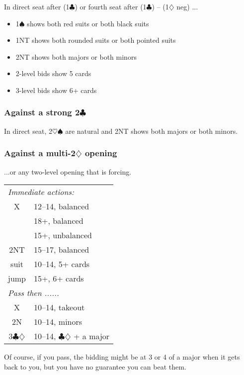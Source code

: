 \documentclass[a4paper, twoside, 11pt]{article}
\begin{document}
\begin{multicols}{3}
In direct seat after (1$\clubsuit$) or fourth seat after (1$\clubsuit$) -- (1$\diamondsuit$ neg) ...
\begin{itemize}
    \item 1$\spadesuit$ shows both red suits or both black suits
    \item 1NT shows both rounded suits or both pointed suits
    \item 2NT shows both majors or both minors
    \item 2-level bids show 5 cards
    \item 3-level bids show 6+ cards
\end{itemize}

\subsubsection*{Against a strong 2$\clubsuit$}
In direct seat, 2$\heartsuit\spadesuit$ are natural and 2NT shows both majors or both minors.




\subsubsection*{Against a multi-2$\diamondsuit$ opening}

...or any two-level opening that is forcing.

\begin{center}
\begin{tabular}{ |cl| }
 \hline
   \multicolumn{2}{|l|}{\textit{Immediate actions:}} \\
 X & 12--14, balanced     \\
 & 18+, balanced \\
 & 15+,  unbalanced \\
 2NT & 15--17, balanced \\
 suit & 10--14, 5+ cards \\
 jump & 15+, 6+ cards\\
 \hline
  \multicolumn{2}{|l|}{\textit{Pass then ......}} \\
 X & 10--14, takeout \\
2N & 10--14, minors \\
 3$\clubsuit\diamondsuit$ & 10--14, $\clubsuit\diamondsuit$ + a major \\
 \hline
\end{tabular}
\end{center}

Of course, if you pass, the bidding might be at 3 or 4 of a major when it gets back to you, but you have no guarantee you can beat them.


\end{multicols}
\end{document}
